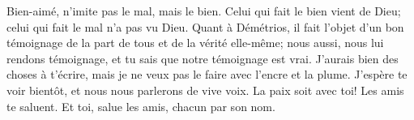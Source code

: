 Bien-aimé, n’imite pas le mal, mais le bien.
Celui qui fait le bien vient de Dieu;
	celui qui fait le mal n’a pas vu Dieu.
Quant à Démétrios, il fait l’objet d’un bon témoignage de la part de tous
		et de la vérité elle-même;
	nous aussi, nous lui rendons témoignage,
	et tu sais que notre témoignage est vrai.
J’aurais bien des choses à t’écrire,
	mais je ne veux pas le faire avec l’encre et la plume.
J’espère te voir bientôt, et nous nous parlerons de vive voix.
La paix soit avec toi! Les amis te saluent.
	Et toi, salue les amis, chacun par son nom.
